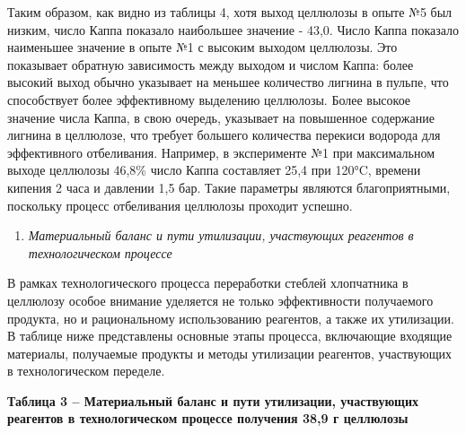 Таким образом, как видно из таблицы 4, хотя выход целлюлозы в опыте №5
был низким, число Каппа показало наибольшее значение - 43,0. Число Каппа
показало наименьшее значение в опыте №1 с высоким выходом целлюлозы. Это
показывает обратную зависимость между выходом и числом Каппа: более
высокий выход обычно указывает на меньшее количество лигнина в пульпе,
что способствует более эффективному выделению целлюлозы. Более высокое
значение числа Каппа, в свою очередь, указывает на повышенное содержание
лигнина в целлюлозе, что требует большего количества перекиси водорода
для эффективного отбеливания. Например, в эксперименте №1 при
максимальном выходе целлюлозы 46,8\% число Каппа составляет 25,4 при
120°C, времени кипения 2 часа и давлении 1,5 бар. Такие параметры
являются благоприятными, поскольку процесс отбеливания целлюлозы
проходит успешно.

\begin{enumerate}
\def\labelenumi{\arabic{enumi}.}
\setcounter{enumi}{5}
\item
  \emph{Материальный баланс и пути утилизации, участвующих реагентов в
  технологическом процессе}
\end{enumerate}

В рамках технологического процесса переработки стеблей хлопчатника в
целлюлозу особое внимание уделяется не только эффективности получаемого
продукта, но и рациональному использованию реагентов, а также их
утилизации. В таблице ниже представлены основные этапы процесса,
включающие входящие материалы, получаемые продукты и методы утилизации
реагентов, участвующих в технологическом переделе.

{\bfseries Таблица 3 -- Материальный баланс и пути утилизации, участвующих
реагентов в технологическом процессе получения 38,9 г целлюлозы}

